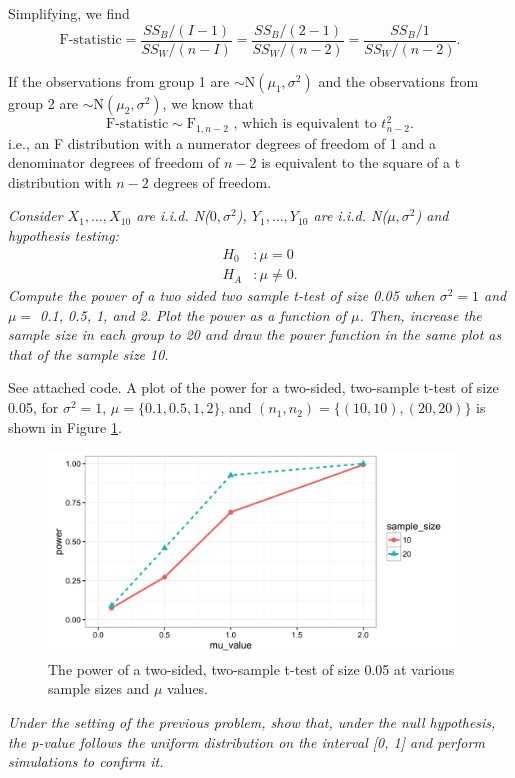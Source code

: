 \documentclass[11pt]{exam} %
\begin{document}
\begin{questions}
Simplifying, we find
$$\text{F-statistic} =  \frac{SS_B / (I-1) }{SS_W / (n-I)} = \frac{SS_B / (2-1) }{SS_W / (n-2)} = \frac{SS_B / 1 }{SS_W / (n-2)}.$$

If the observations from group 1 are $\sim \text{N}(\mu_1, \sigma^2)$ and the observations from group 2 are $\sim \text{N}(\mu_2, \sigma^2)$, we know that
$$\text{F-statistic} \sim \text{F}_{1, n-2} \text{ , which is equivalent to }t^2_{n-2}.$$
i.e., an F distribution with a numerator degrees of freedom of 1 and a denominator degrees of freedom of $n-2$ is equivalent to the square of a t distribution with $n-2$ degrees of freedom.



\titledquestion{} %
\textit{Consider $X_1,\ldots,X_{10}$ are i.i.d. N($0,\sigma^2$), $Y_1,\ldots,Y_{10}$ are i.i.d. N($\mu,\sigma^2$) and hypothesis testing:}
\begin{align*}
H_0 &: \mu = 0\\
H_A &: \mu \neq 0.
\end{align*}
\textit{Compute the power of a two sided two sample t-test of size 0.05 when $\sigma^2 = 1$ and $\mu =$ 0.1, 0.5, 1, and 2. Plot the power as a function of $\mu$. Then, increase the sample size in each group to 20 and draw the power function in the same plot as that of the sample size 10.}

See attached code. A plot of the power for a two-sided, two-sample t-test of size 0.05, for $\sigma^2 =1$, $\mu = \{0.1, 0.5, 1, 2 \}$, and $(n_1, n_2) = \{(10,10), (20,20)\}$ is shown in Figure \ref{fig:6}.

\begin{figure}[!h]
	\centering
	\includegraphics[width=4.25in]{6.png}
	\caption{The power of a two-sided, two-sample t-test of size 0.05 at various sample sizes and $\mu$ values.}
	\label{fig:6}
\end{figure}



\titledquestion{} %
\textit{Under the setting of the previous problem, show that, under the null hypothesis, the p-value follows the uniform distribution on the interval [0, 1] and perform simulations to confirm it.}


\end{questions}
\end{document}

